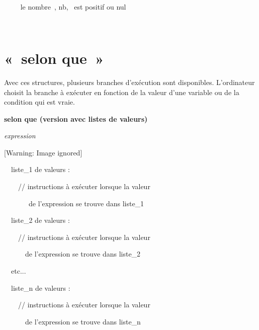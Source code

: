 {\ \ }

{\sffamily
\ \ \ \  {\textquotedbl}le
nombre~{\textquotedbl}, nb, {\textquotedbl}~est positif ou
nul{\textquotedbl}}

{\sffamily
\ \  }

{\sffamily
{} }


\bigskip

\section{«~selon que~»}
{
Avec ces structures, plusieurs branches d'exécution
sont disponibles. L'ordinateur choisit la branche à
exécuter en fonction de la valeur d'une variable ou de
la condition qui est vraie.}

{\sffamily\bfseries
selon que (version avec listes de valeurs)}

{\sffamily
{}  \textit{expression}
}

\begin{center}
 [Warning: Image ignored] %

\end{center}

\bigskip

{\sffamily
\ \ liste\_1 de valeurs : }

{\sffamily
\ \ \ \ // instructions à exécuter lorsque la valeur}

{\sffamily
\ \ \ \ \ \ \ de l’expression se trouve dans liste\_1 }


\bigskip

{\sffamily
\ \ liste\_2 de valeurs : }

{\sffamily
\ \ \ \ // instructions à exécuter lorsque la valeur }

{\sffamily
\ \ \ \ \ \ de l’expression se trouve dans liste\_2 }

{\sffamily
\ \ etc...}


\bigskip

{\sffamily
\ \ liste\_n de valeurs : }

{\sffamily
\ \ \ \ // instructions à exécuter lorsque la valeur }

{\sffamily
\ \ \ \ \ \ de l’expression se trouve dans liste\_n }


